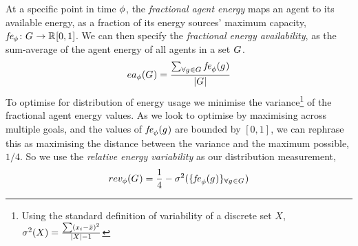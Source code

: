\newcommand{\functionEnergyAvailable}[2]{
	\ifx \\#1\\
	\functionSignature{ea_{\varTime{}{}}}{\setAgents{}{}}
	\else
	\functionSignature{ea_{\varTime{}{}}}{#1}
	\fi
}
At a specific point in time $\phi$, the \textit{fractional agent energy} maps an agent to its available energy, as a fraction of its energy sources' maximum capacity, $\formalAgentEnergyAvailable{}{}$. We can then specify the \textit{fractional energy availability}, as the sum-average of the agent energy of all agents in a set $G_{}^{}$.
\begin{equation}
	\functionEnergyAvailable{}{} 
	= \dfrac{\sum_{\forall \varAgent{}{} \in \setAgents{}{}} \functionAgentEnergyAvailable{\varAgent{i}{}}{}}
	{\funcSize{\setAgents{}{}}}
\end{equation}
To optimise for distribution of energy usage we minimise the variance\footnote{Using the standard definition of variability of a discrete set $X$, $\sigma^2(X) = \frac{\sum (x_i - \bar{x})^2}{\lvert X \rvert-1}$} of the fractional agent energy values. As we look to optimise by maximising across multiple goals, and the values of $\functionAgentEnergyAvailable{}{}$ are bounded by $[0, 1]$, we can rephrase this as maximising the distance between the variance and the maximum possible, $1/4$. So we use the \textit{relative energy variability} as our distribution measurement,
\begin{equation}     	
	\functionEnergyVariability{}{} 
	= \frac{1}{4} - \sigma^2(
	\lbrace \functionAgentEnergyAvailable{}{}
	\rbrace_{\forall \varAgent{}{} \in \setAgents{}{}}
	)
\end{equation}


